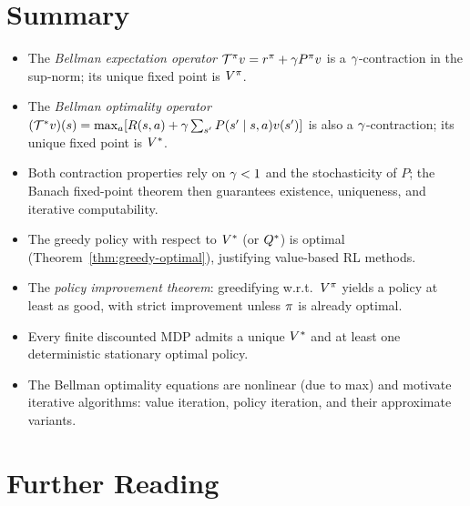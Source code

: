 \documentclass[11pt,a4paper]{article}
\begin{document}
\section{Summary}
\label{sec:summary}

\begin{itemize}
    \item The \emph{Bellman expectation operator}
    $\mathcal{T}^\pi v = r^\pi + \gamma P^\pi v$ is a
    $\gamma$-contraction in the sup-norm; its unique fixed point
    is $V^{\pi}$.
    \item The \emph{Bellman optimality operator}
    $(\mathcal{T}^* v)(s) = \max_a [R(s,a) + \gamma \sum_{s'}
    P(s' \mid s,a) v(s')]$ is also a $\gamma$-contraction; its
    unique fixed point is $V^*$.
    \item Both contraction properties rely on $\gamma < 1$ and
    the stochasticity of $P$; the Banach fixed-point theorem then
    guarantees existence, uniqueness, and iterative computability.
    \item The greedy policy with respect to $V^*$ (or $Q^*$)
    is optimal (Theorem~\ref{thm:greedy-optimal}), justifying
    value-based RL methods.
    \item The \emph{policy improvement theorem}: greedifying w.r.t.\
    $V^{\pi}$ yields a policy at least as good, with strict improvement
    unless $\pi$ is already optimal.
    \item Every finite discounted MDP admits a unique $V^*$ and at
    least one deterministic stationary optimal policy.
    \item The Bellman optimality equations are nonlinear (due to max)
    and motivate iterative algorithms: value iteration, policy
    iteration, and their approximate variants.
\end{itemize}


\section{Further Reading}
\label{sec:further-reading}
\end{document}
